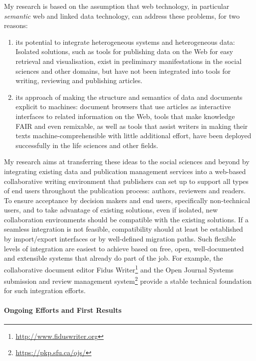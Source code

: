 \documentclass[a4paper,USenglish]{dagrep}
\begin{document}
My research is based on the assumption that web technology, in particular
\emph{semantic} web and linked data technology, can address these problems, for
two reasons:
\begin{enumerate}
\item its potential to integrate heterogeneous systems and heterogeneous data:
Isolated solutions, such as tools for publishing data on the Web for easy
retrieval and visualisation, exist in preliminary manifestations in the social
sciences and other domains, but have not been integrated into tools for writing,
reviewing and publishing articles.
\item its approach of making the structure and semantics of data and documents
explicit to machines: document browsers that use articles as interactive
interfaces to related information on the Web, tools that make knowledge FAIR and
even remixable, as well as tools that assist writers in making their texts
machine-comprehensible with little additional effort, have been deployed
successfully in the life sciences and other fields.
\end{enumerate}

My research aims at transferring these ideas to the social sciences and beyond
by integrating existing data and publication management services into a
web-based collaborative writing environment that publishers can set up to
support all types of end users throughout the publication process: authors,
reviewers and readers.
To ensure acceptance by decision makers and end users, specifically
non-technical users, and to take advantage of existing solutions, even if
isolated, new collaboration environments should be compatible with the existing
solutions.
If a seamless integration is not feasible, compatibility should at least be
established by import/export interfaces or by well-defined migration paths.
Such flexible levels of integration are easiest to achieve based on free, open,
well-documented and extensible systems that already do part of the job.
For example, the collaborative document editor Fidus
Writer\footnote{\url{http://www.fiduswriter.org}} and the Open Journal Systems
submission and review management system\footnote{\url{https://pkp.sfu.ca/ojs/}}
provide a stable technical foundation for such integration efforts.

\paragraph*{Ongoing Efforts and First Results}
\end{document}
